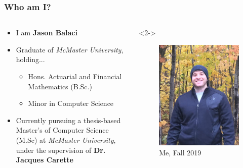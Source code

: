 \documentclass{beamer}
\begin{document}
\begin{frame}
    \frametitle{Who am I?}
    \begin{columns}[T,onlytextwidth]
        \begin{column}{.5\textwidth}
            \begin{minipage}{\textwidth}
                \begin{itemize}
                    \item<2-> I am \textbf{Jason Balaci}
                    \item<3-> Graduate of \emph{McMaster University}, holding...
                        \begin{itemize}
                            \item<4-> Hons. Actuarial and Financial Mathematics (B.Sc.)
                            \item<5-> Minor in Computer Science
                        \end{itemize}
                    \item<6-> Currently pursuing a thesis-based Master's of Computer Science (M.Sc) at \emph{McMaster University}, under the supervision of \textbf{Dr. Jacques Carette}
                \end{itemize}
            \end{minipage}
        \end{column}
        \begin{column}{.45\textwidth}<2->
            \begin{figure}
                \includegraphics[width=.8\textwidth]{assets/me.jpeg}
                \caption{Me, Fall 2019}
            \end{figure}
        \end{column}
    \end{columns}
\end{frame}
\end{document}
